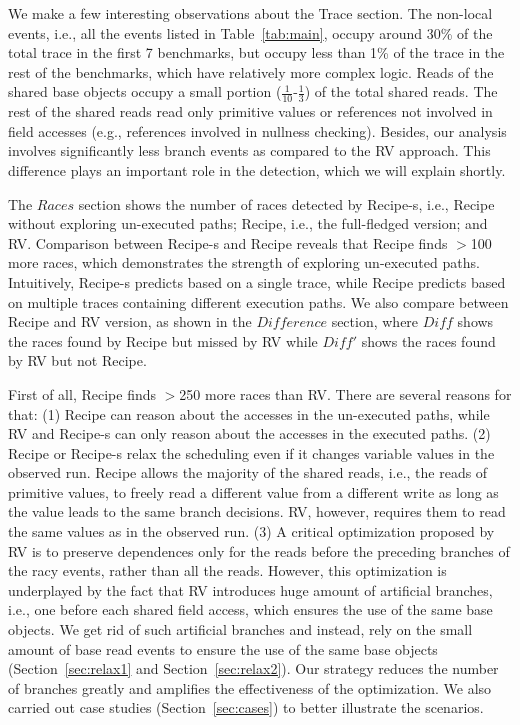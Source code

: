 We make a few interesting observations about the Trace section. 
The non-local events, i.e., all the events listed in Table~\ref{tab:main}, 
occupy around 30\% of the total trace in the first 7 benchmarks, 
but occupy less than 1\% of the trace in the rest of the benchmarks, 
which have relatively more complex logic. Reads of the shared base objects 
occupy a small portion ($\frac{1}{10}$-$\frac{1}{3}$) of the total 
shared reads. The rest of the shared reads read only primitive values 
or references not involved in field accesses (e.g., references involved 
in nullness checking). Besides, our analysis involves significantly less branch events as compared to the {\sf RV} approach. This difference plays an important role in the detection, which we will explain shortly.


The $Races$ section shows the number of races detected by {\sf Recipe-s}, 
i.e., {\sf Recipe} without exploring un-executed paths; {\sf Recipe}, i.e., the full-fledged version; and {\sf RV}. Comparison between {\sf Recipe-s} 
and {\sf Recipe} reveals that {\sf Recipe} finds $>$100 more races, 
which demonstrates the strength of exploring  un-executed paths. 
Intuitively,  {\sf Recipe-s} predicts based on a single trace, while 
{\sf Recipe} predicts based on multiple traces containing different 
execution paths. We also compare between {\sf Recipe} and {\sf RV} version, 
as shown in the $Difference$ section, where $Diff$ shows the races found 
by {\sf Recipe} but missed by {\sf RV} while $Diff'$ shows the races 
found by {\sf RV} but not {\sf Recipe}.

First of all, {\sf Recipe} finds $>$250 more races than {\sf RV}. There 
are several reasons for that: (1) {\sf Recipe} can reason about the 
accesses in the un-executed paths, while {\sf RV} and {\sf Recipe-s} can 
only reason about the accesses in the executed paths. (2) {\sf Recipe} 
or {\sf Recipe-s} relax the scheduling even if it 
changes variable values in the observed run. {\sf Recipe} allows the 
majority of the shared reads, i.e., the reads of primitive values, 
to freely read a different value from a different write 
as long as the value leads to the same branch decisions. {\sf RV}, however, 
requires them to read the same values as in the observed run. (3) A
critical optimization proposed by {\sf RV} is to preserve dependences 
only for the reads before the preceding branches of the racy events, 
rather than all the reads. However, this optimization is underplayed 
by the fact that {\sf RV} introduces huge amount of artificial 
branches, i.e., one before each shared field access, which ensures 
the use of the same base objects.
We get rid of such artificial branches and instead, rely on the small 
amount of base read events to ensure the use of the same base 
objects (Section~\ref{sec:relax1} and Section~\ref{sec:relax2}). Our strategy reduces the number of branches 
greatly and amplifies the effectiveness of the optimization. We also 
carried out case studies (Section~\ref{sec:cases}) to better illustrate the scenarios.

